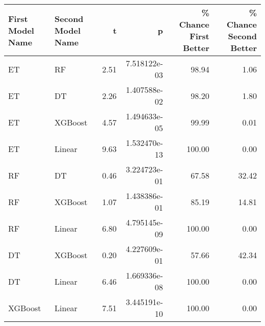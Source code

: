 \begin{tabular}{llrrrr}
\toprule
First Model Name & Second Model Name &    t &            p &  \% Chance First Better &  \% Chance Second Better \\
\midrule
              ET &                RF & 2.51 & 7.518122e-03 &                  98.94 &                    1.06 \\
              ET &                DT & 2.26 & 1.407588e-02 &                  98.20 &                    1.80 \\
              ET &           XGBoost & 4.57 & 1.494633e-05 &                  99.99 &                    0.01 \\
              ET &            Linear & 9.63 & 1.532470e-13 &                 100.00 &                    0.00 \\
              RF &                DT & 0.46 & 3.224723e-01 &                  67.58 &                   32.42 \\
              RF &           XGBoost & 1.07 & 1.438386e-01 &                  85.19 &                   14.81 \\
              RF &            Linear & 6.80 & 4.795145e-09 &                 100.00 &                    0.00 \\
              DT &           XGBoost & 0.20 & 4.227609e-01 &                  57.66 &                   42.34 \\
              DT &            Linear & 6.46 & 1.669336e-08 &                 100.00 &                    0.00 \\
         XGBoost &            Linear & 7.51 & 3.445191e-10 &                 100.00 &                    0.00 \\
\bottomrule
\end{tabular}
